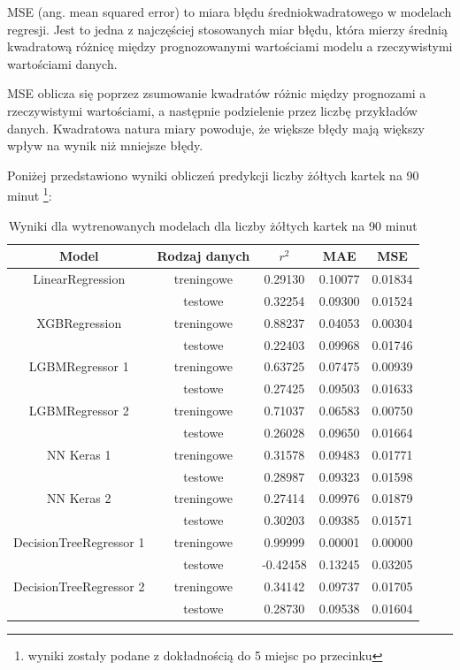 \documentclass{article}
\begin{document}
MSE (ang. mean squared error) to miara błędu średniokwadratowego w modelach regresji. Jest to jedna z najczęściej stosowanych miar błędu, która mierzy średnią kwadratową różnicę między prognozowanymi wartościami modelu a rzeczywistymi wartościami danych.

MSE oblicza się poprzez zsumowanie kwadratów różnic między prognozami a rzeczywistymi wartościami, a następnie podzielenie przez liczbę przykładów danych. Kwadratowa natura miary powoduje, że większe błędy mają większy wpływ na wynik niż mniejsze błędy.


Poniżej przedstawiono wyniki obliczeń predykcji liczby żółtych kartek na 90 minut \footnote{wyniki zostały podane z dokładnością do 5 miejsc po przecinku}:

\begin{table}[H]
\centering
\begin{tabular}{|c|c|c|c|c|}
\hline
Model & Rodzaj danych & $r^2$ & MAE & MSE \\ \hline
\cline{2-5}
LinearRegression & treningowe & 0.29130 & 0.10077 & 0.01834 \\
\cline{2-5}
& testowe & 0.32254 & 0.09300 & 0.01524 \\
\hline
XGBRegression & treningowe & 0.88237 & 0.04053 & 0.00304 \\
\cline{2-5}
& testowe & 0.22403 & 0.09968 & 0.01746 \\
\hline
LGBMRegressor 1 & treningowe & 0.63725 & 0.07475 & 0.00939 \\
\cline{2-5}
& testowe & 0.27425 & 0.09503 & 0.01633 \\
\hline
LGBMRegressor 2 & treningowe & 0.71037 & 0.06583 & 0.00750 \\
\cline{2-5}
& testowe & 0.26028 & 0.09650 & 0.01664 \\
\hline
NN Keras 1 & treningowe & 0.31578 & 0.09483 & 0.01771 \\
\cline{2-5}
& testowe & 0.28987 & 0.09323 & 0.01598 \\
\hline
NN Keras 2 & treningowe & 0.27414 & 0.09976 & 0.01879 \\
\cline{2-5}
& testowe & 0.30203 & 0.09385 & 0.01571 \\
\hline
DecisionTreeRegressor 1 & treningowe & 0.99999 & 0.00001 & 0.00000 \\
\cline{2-5}
& testowe & -0.42458 & 0.13245 & 0.03205 \\
\hline
DecisionTreeRegressor 2 & treningowe & 0.34142 & 0.09737 & 0.01705 \\
\cline{2-5}
& testowe & 0.28730 & 0.09538 & 0.01604 \\
\hline
\end{tabular}
\caption{Wyniki dla wytrenowanych modelach dla liczby żółtych kartek na 90 minut}
\end{table}
\end{document}
